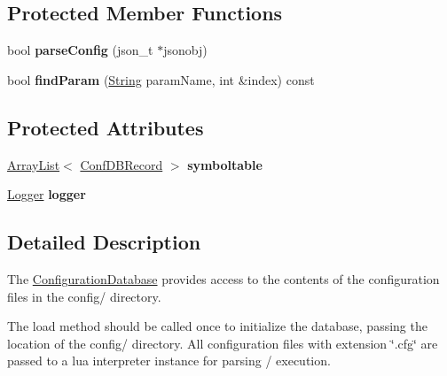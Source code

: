 \subsection*{Protected Member Functions}
\begin{DoxyCompactItemize}
\item 
bool {\bfseries parse\+Config} (json\+\_\+t $\ast$jsonobj)\hypertarget{classisat__utils_1_1_configuration_database_ae7f1dcdabef0a0d7b00739014daffbe4}{}\label{classisat__utils_1_1_configuration_database_ae7f1dcdabef0a0d7b00739014daffbe4}

\item 
bool {\bfseries find\+Param} (\hyperlink{classisat__utils_1_1_string}{String} param\+Name, int \&index) const \hypertarget{classisat__utils_1_1_configuration_database_ae2f3ff5553bef7ccf187d5088408088a}{}\label{classisat__utils_1_1_configuration_database_ae2f3ff5553bef7ccf187d5088408088a}

\end{DoxyCompactItemize}
\subsection*{Protected Attributes}
\begin{DoxyCompactItemize}
\item 
\hyperlink{classisat__utils_1_1_array_list}{Array\+List}$<$ \hyperlink{structisat__utils_1_1_conf_d_b_record}{Conf\+D\+B\+Record} $>$ {\bfseries symboltable}\hypertarget{classisat__utils_1_1_configuration_database_affd1efd34ebbec7f83375d4da911cfe5}{}\label{classisat__utils_1_1_configuration_database_affd1efd34ebbec7f83375d4da911cfe5}

\item 
\hyperlink{classisat__utils_1_1_logger}{Logger} {\bfseries logger}\hypertarget{classisat__utils_1_1_configuration_database_a09cb5bd5df5adbd1b55070a169d0b0d0}{}\label{classisat__utils_1_1_configuration_database_a09cb5bd5df5adbd1b55070a169d0b0d0}

\end{DoxyCompactItemize}


\subsection{Detailed Description}
The \hyperlink{classisat__utils_1_1_configuration_database}{Configuration\+Database} provides access to the contents of the configuration files in the config/ directory.

The load method should be called once to initialize the database, passing the location of the config/ directory. All configuration files with extension \char`\"{}.\+cfg\char`\"{} are passed to a lua interpreter instance for parsing / execution. 

